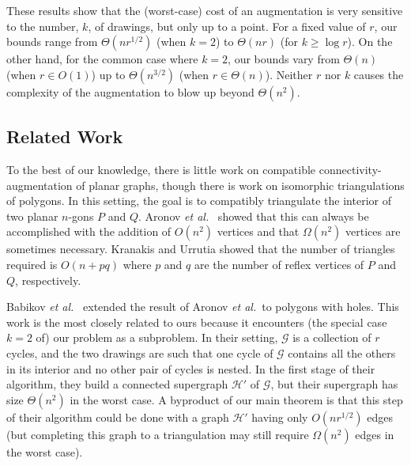 \documentclass{patmorin}
\newcommand{\etal}{\emph{et al.}}
\begin{document}
These results show that the (worst-case) cost of an augmentation is very
sensitive to the number, $k$, of drawings, but only up to a point.
For a fixed value of $r$, our bounds range from $\Theta(nr^{1/2})$ (when
$k=2$) to $\Theta(nr)$ (for $k\ge \log r$).  On the other hand, for the
common case where $k=2$, our bounds vary from $\Theta(n)$ (when $r\in
O(1)$) up to $\Theta(n^{3/2})$ (when $r\in\Theta(n)$).  Neither $r$ nor $k$
causes the complexity of the augmentation to blow up beyond $\Theta(n^2)$.


\subsection{Related Work} 

To the best of our knowledge, there is little work on
compatible connectivity-augmentation of planar graphs, though
there is work on isomorphic triangulations of polygons.   In this setting, the goal is to compatibly triangulate the interior of two planar $n$-gons $P$ and $Q$.
Aronov \etal\ \cite{aronov.seidel.ea:compatible} showed that this can always
be accomplished with the addition of $O(n^2)$ vertices and that
$\Omega(n^2)$ vertices are sometimes necessary.  Kranakis and Urrutia
\cite{kranakis.urrutia:isomorphic} showed that the
number of triangles required is $O(n+pq)$ where $p$ and $q$ are the
number of reflex vertices of $P$ and $Q$, respectively.


Babikov \etal\ \cite{babikov.souvaine.ea:constructing} extended the result of Aronov \etal\ to polygons with holes. This work is the most closely related to ours because it encounters (the special case $k=2$ of) our problem as a subproblem. In their setting, $\mathcal G$ is a collection of $r$ cycles, and the two drawings are such that one cycle of $\mathcal G$ contains all the others in its interior and no other pair of cycles is nested. In the first stage of their algorithm, they build a connected supergraph $\mathcal{H}'$ of $\mathcal{G}$, but their supergraph has size $\Theta(n^2)$ in the worst case.  A byproduct of our main theorem is that this step of their algorithm could be done with a graph $\mathcal{H}'$ having only $O(nr^{1/2})$ edges (but completing this graph to a triangulation may still require $\Omega(n^2)$ edges in the worst case).
\end{document}

